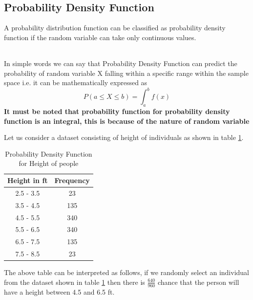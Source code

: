\documentclass[twoside,12pt]{report}  %
\begin{document}
\subsection{Probability Density Function}

\begin{tcolorbox}[colback=red!5!white, colframe=red!75!black, title = \textbf{Probability Density Function}]
	A probability distribution function can be classified as probability density function if the random variable can take only continuous values.
\end{tcolorbox}
\noindent
\\
In simple words we can say that Probability Density Function can predict the probability of random variable X falling within a specific range within the sample space i.e. it can be mathematically expressed as
$$ P(a \le X \le b) = \int_{a}^{b} f(x) $$
\noindent
\textbf{It must be noted that probability function for probability density function is an integral, this is because of the nature of random variable} 
\\
\begin{tcolorbox}[colback=blue!5!white, colframe=blue!75!black, title = \textbf{Probability Density Function}]
	Let us consider a dataset consisting of height of individuals as shown in table \ref{table_probabilitydensityfunction_example}.
	
	\begin{table}[H]
		\centering
		\begin{tabular}{c|c}
			\textbf{Height in ft} & \textbf{Frequency} \\
			\hline
			2.5 - 3.5       & 23                 \\
			3.5 - 4.5       & 135                \\
			4.5 - 5.5       & 340                \\
			5.5 - 6.5       & 340                \\
			6.5 - 7.5       & 135                \\
			7.5 - 8.5       & 23                
		\end{tabular}
		\caption{Probability Density Function for Height of people}
		\label{table_probabilitydensityfunction_example}
	\end{table}
	
	The above table can be interpreted as follows, if we randomly select an individual from the dataset shown in table \ref{table_probabilitydensityfunction_example} then there is $\frac{640}{960}$ chance that the person will have a height between 4.5 and 6.5 ft.
\end{tcolorbox}
\end{document}
